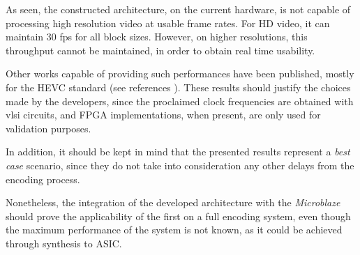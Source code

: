 As seen, the constructed architecture, on the current hardware, is not capable of processing high resolution video at usable frame rates. For HD video, it can maintain 30 fps for all block sizes. However, on higher resolutions, this throughput cannot be maintained, in order to obtain real time usability. 

Other works capable of providing such performances have been published, mostly for the HEVC standard (see references \cite{vayalilEfficientASICDesign2016,meherEfficientIntegerDCT2014,m.HighPerformanceInteger2017}). These results should justify the choices made by the developers, since the proclaimed clock frequencies are obtained with \gls{vlsi} circuits, and FPGA implementations, when present, are only used for validation purposes.

In addition, it should be kept in mind that the presented results represent a \emph{best case} scenario, since they do not take into consideration any other delays from the encoding process.

Nonetheless, the integration of the developed architecture with the \emph{Microblaze} should prove the applicability of the first on a full encoding system, even though the maximum performance of the system is not known, as it could be achieved through synthesis to ASIC.





\clearpage
\printbibliography[heading=subbibliography]
